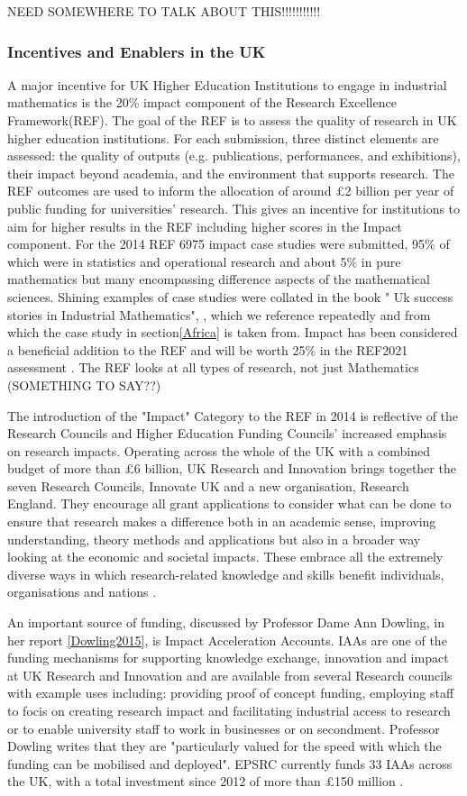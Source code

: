 \documentclass[11pt]{article} %
\begin{document}
NEED SOMEWHERE TO TALK ABOUT THIS!!!!!!!!!!!
\subsubsection{Incentives and Enablers in the UK} 
A major incentive for UK Higher Education Institutions to engage in industrial mathematics is the 20\% impact component of the Research Excellence Framework(REF). The goal of the REF is to assess the quality of research in UK higher education institutions. For each submission, three distinct elements are assessed: the quality of outputs (e.g. publications, performances, and exhibitions), their impact beyond academia, and the environment that supports research. The REF outcomes are used to inform the allocation of around £2 billion per year of public funding for universities’ research.  This gives an incentive for institutions to aim for higher results in the REF including higher scores in the Impact component. For the 2014 REF 6975 impact case studies were submitted, 95\% of which were in statistics and operational research and about 5\% in pure mathematics but many encompassing difference aspects of the mathematical sciences. Shining examples of case studies were collated in the book " Uk success stories in Industrial Mathematics", \cite{Aston2016},  which we reference repeatedly and from which the case study in section\ref{Africa} is taken from. Impact has been considered a beneficial addition to the REF and will be worth 25\% in the REF2021 assessment \cite{REF2017}. The REF looks at all types of research, not just Mathematics (SOMETHING TO SAY??)

The introduction of the "Impact" Category to the REF in 2014 is reflective of the Research Councils and Higher Education Funding Councils' increased emphasis on research impacts. Operating across the whole of the UK with a combined budget of more than £6 billion, UK Research and Innovation brings together the seven Research Councils, Innovate UK and a new organisation, Research England. They encourage all grant applications to consider  what can be done to ensure that research makes a difference both in an academic sense, improving understanding, theory methods and applications but also in a broader way looking at the economic and societal impacts. These embrace all the extremely diverse ways in which research-related knowledge and skills benefit individuals, organisations and nations \cite{UKRI}. 

An important source of funding, discussed by Professor Dame Ann Dowling, in her report \ref{Dowling2015}, is Impact Acceleration Accounts. IAAs are one of the funding mechanisms for supporting knowledge exchange, innovation and impact at UK Research and Innovation and are available from several Research councils with example uses including: providing proof of concept funding, employing staff to focis on creating research impact and facilitating industrial access to research or to enable university staff to work in businesses or on secondment. Professor Dowling writes that they are "particularly valued for the speed with which the funding can be mobilised and deployed".  EPSRC currently funds 33 IAAs across the UK, with a total investment since 2012 of more than £150 million \cite{IAA}.
		
\end{document}
